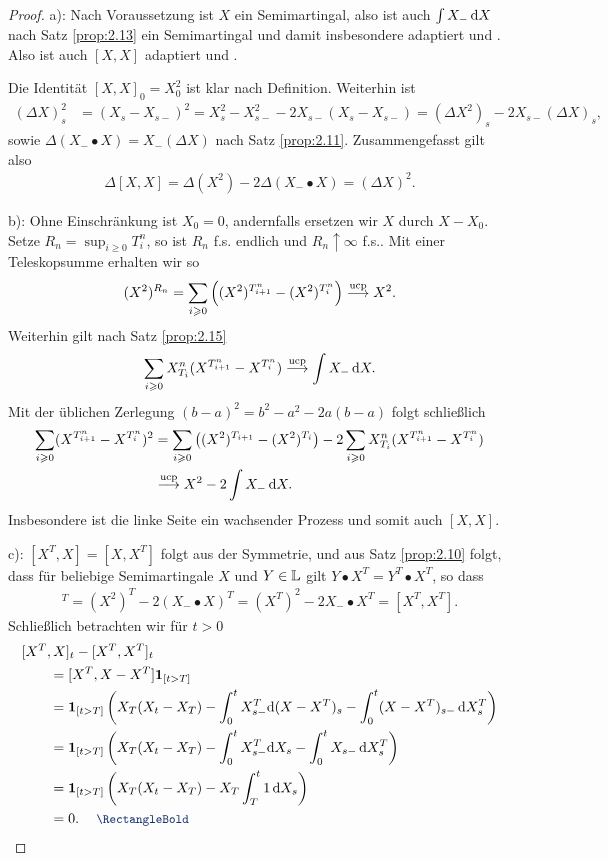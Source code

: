\begin{proof}
a): Nach Voraussetzung ist $X$ ein Semimartingal, also ist auch $\int X_-\,\mathrm{d} X$
nach Satz \ref{prop:2.13} ein Semimartingal und damit insbesondere adaptiert und
\cadlag. Also ist auch $[X,X]$ adaptiert und \cadlag.

Die Identität $[X,X]_0 = X_0^2$ ist klar nach Definition. Weiterhin ist
\begin{align*}
(\Delta X)_s^2 &= (X_s - X_{s-})^2 = X_s^2 - X_{s-}^2 - 2 X_{s-}(X_s - X_{s-})
= (\Delta X^2)_s  - 2 X_{s-} (\Delta X)_s,
\end{align*}
sowie $\Delta (X_- \bullet X) = X_- (\Delta X)$ nach Satz \ref{prop:2.11}.
Zusammengefasst gilt also
\begin{align*}
\Delta [X,X] = \Delta (X^2) - 2\Delta (X_- \bullet X)
= (\Delta X)^2.
\end{align*}

b): Ohne Einschränkung ist $X_0 = 0$, andernfalls ersetzen wir $X$ durch
$X-X_0$. Setze  $R_n = \sup_{i\ge 0} T_i^n$, so ist $R_n$ f.s.
endlich und $R_n\uparrow \infty$ f.s.. Mit einer Teleskopsumme erhalten wir so
\begin{align*}
(X^2)^{R_n} = \sum_{i\geqslant 0} \left((X^2)^{T_{i+1}^n}-(X^2)^{T_{i}^n}\right)
\overset{\text{ucp}}{\longrightarrow} X^2.
\end{align*}
Weiterhin gilt nach Satz \ref{prop:2.15}
\begin{align*}
\sum_{i\geqslant 0} X_{T_i}^n (X^{T_{i+1}^n}- X^{T_i^n}) \overset{\text{ucp}}{\longrightarrow} \int X_-\,\mathrm{d} X. 
\end{align*}
Mit der üblichen Zerlegung $(b-a)^2  = b^2-a^2 - 2a(b-a)$ folgt schließlich
\begin{align*}
\sum_{i\geqslant 0} (X^{T_{i+1}^n}- X^{T_i^n})^2 &=
\sum_{i\geqslant 0} \left((X^2)^{T_{i+1}}-(X^2)^{T_{i}}\right)
-
2\sum_{i\geqslant 0} X_{T_i}^n (X^{T_{i+1}^n}- X^{T_i^n})\\
&\overset{\text{ucp}}{\longrightarrow} X^2 - 2\int X_-\,\mathrm{d} X.
\end{align*}
Insbesondere ist die linke Seite ein wachsender Prozess und somit auch $[X,X]$.

c): $[X^T,X] = [X,X^T]$ folgt aus der Symmetrie, und aus Satz \ref{prop:2.10}
folgt, dass für beliebige Semimartingale $X$ und $Y\in\mathbb{L}$ gilt  $Y\bullet X^T =
Y^T \bullet X^T$, so dass
\begin{align*}
[X,X]^T = (X^2)^T - 2 (X_-\bullet X)^T = 
(X^T)^2 - 2X_- \bullet X^T
=
[X^T,X^T].
\end{align*}
Schließlich betrachten wir für $t > 0$
\begin{align*}
&[X^T,X]_t-[X^T,X^T]_t\\
&\qquad= [X^T,X-X^T]\Id_{[t > T]}\\
&\qquad=\Id_{[t>  T]} \left(X_T(X_t-X_T) - \int_0^t X^T_{s-} \diffd (X-X^T)_s
- \int_0^t (X-X^T)_{s-}\dX^T_{s}
\right)  \\
&\qquad=\Id_{[t>  T]} \left(X_T(X_t-X_T) - \int_0^t X^T_{s-} \diffd X_s
- \int_0^t X_{s-}\dX^T_{s}
\right)\\
&\qquad=\Id_{[t>  T]} \left(X_T(X_t-X_T) - X_T \int_T^t 1\, \diffd X_s
\right)\\
&\qquad =0.\qed
\end{align*}
\end{proof}


